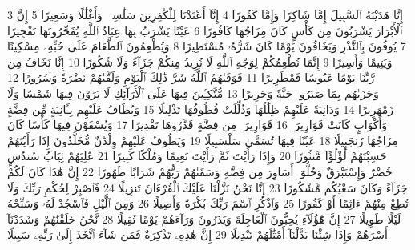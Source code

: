 {\tiny\colorbox{cl_aya}{3}} إِنَّا هَدَيْنَٰهُ ٱلسَّبِيلَ إِمَّا شَاكِرًا وَإِمَّا كَفُورًا
{\tiny\colorbox{cl_aya}{4}} إِنَّآ أَعْتَدْنَا لِلْكَٰفِرِينَ سَلَٰسِلَا۟ وَأَغْلَٰلًا وَسَعِيرًا
{\tiny\colorbox{cl_aya}{5}} إِنَّ ٱلْأَبْرَارَ يَشْرَبُونَ مِن كَأْسٍ كَانَ مِزَاجُهَا كَافُورًا
{\tiny\colorbox{cl_aya}{6}} عَيْنًا يَشْرَبُ بِهَا عِبَادُ ٱللَّهِ يُفَجِّرُونَهَا تَفْجِيرًا
{\tiny\colorbox{cl_aya}{7}} يُوفُونَ بِٱلنَّذْرِ وَيَخَافُونَ يَوْمًا كَانَ شَرُّهُۥ مُسْتَطِيرًا
{\tiny\colorbox{cl_aya}{8}} وَيُطْعِمُونَ ٱلطَّعَامَ عَلَىٰ حُبِّهِۦ مِسْكِينًا وَيَتِيمًا وَأَسِيرًا
{\tiny\colorbox{cl_aya}{9}} إِنَّمَا نُطْعِمُكُمْ لِوَجْهِ ٱللَّهِ لَا نُرِيدُ مِنكُمْ جَزَآءً وَلَا شُكُورًا
{\tiny\colorbox{cl_aya}{10}} إِنَّا نَخَافُ مِن رَّبِّنَا يَوْمًا عَبُوسًا قَمْطَرِيرًا
{\tiny\colorbox{cl_aya}{11}} فَوَقَىٰهُمُ ٱللَّهُ شَرَّ ذَٰلِكَ ٱلْيَوْمِ وَلَقَّىٰهُمْ نَضْرَةً وَسُرُورًا
{\tiny\colorbox{cl_aya}{12}} وَجَزَىٰهُم بِمَا صَبَرُوا۟ جَنَّةً وَحَرِيرًا
{\tiny\colorbox{cl_aya}{13}} مُّتَّكِـِٔينَ فِيهَا عَلَى ٱلْأَرَآئِكِ لَا يَرَوْنَ فِيهَا شَمْسًا وَلَا زَمْهَرِيرًا
{\tiny\colorbox{cl_aya}{14}} وَدَانِيَةً عَلَيْهِمْ ظِلَٰلُهَا وَذُلِّلَتْ قُطُوفُهَا تَذْلِيلًا
{\tiny\colorbox{cl_aya}{15}} وَيُطَافُ عَلَيْهِم بِـَٔانِيَةٍ مِّن فِضَّةٍ وَأَكْوَابٍ كَانَتْ قَوَارِيرَا۠
{\tiny\colorbox{cl_aya}{16}} قَوَارِيرَا۟ مِن فِضَّةٍ قَدَّرُوهَا تَقْدِيرًا
{\tiny\colorbox{cl_aya}{17}} وَيُسْقَوْنَ فِيهَا كَأْسًا كَانَ مِزَاجُهَا زَنجَبِيلًا
{\tiny\colorbox{cl_aya}{18}} عَيْنًا فِيهَا تُسَمَّىٰ سَلْسَبِيلًا
{\tiny\colorbox{cl_aya}{19}} وَيَطُوفُ عَلَيْهِمْ وِلْدَٰنٌ مُّخَلَّدُونَ إِذَا رَأَيْتَهُمْ حَسِبْتَهُمْ لُؤْلُؤًا مَّنثُورًا
{\tiny\colorbox{cl_aya}{20}} وَإِذَا رَأَيْتَ ثَمَّ رَأَيْتَ نَعِيمًا وَمُلْكًا كَبِيرًا
{\tiny\colorbox{cl_aya}{21}} عَٰلِيَهُمْ ثِيَابُ سُندُسٍ خُضْرٌ وَإِسْتَبْرَقٌ وَحُلُّوٓا۟ أَسَاوِرَ مِن فِضَّةٍ وَسَقَىٰهُمْ رَبُّهُمْ شَرَابًا طَهُورًا
{\tiny\colorbox{cl_aya}{22}} إِنَّ هَٰذَا كَانَ لَكُمْ جَزَآءً وَكَانَ سَعْيُكُم مَّشْكُورًا
{\tiny\colorbox{cl_aya}{23}} إِنَّا نَحْنُ نَزَّلْنَا عَلَيْكَ ٱلْقُرْءَانَ تَنزِيلًا
{\tiny\colorbox{cl_aya}{24}} فَٱصْبِرْ لِحُكْمِ رَبِّكَ وَلَا تُطِعْ مِنْهُمْ ءَاثِمًا أَوْ كَفُورًا
{\tiny\colorbox{cl_aya}{25}} وَٱذْكُرِ ٱسْمَ رَبِّكَ بُكْرَةً وَأَصِيلًا
{\tiny\colorbox{cl_aya}{26}} وَمِنَ ٱلَّيْلِ فَٱسْجُدْ لَهُۥ وَسَبِّحْهُ لَيْلًا طَوِيلًا
{\tiny\colorbox{cl_aya}{27}} إِنَّ هَٰٓؤُلَآءِ يُحِبُّونَ ٱلْعَاجِلَةَ وَيَذَرُونَ وَرَآءَهُمْ يَوْمًا ثَقِيلًا
{\tiny\colorbox{cl_aya}{28}} نَّحْنُ خَلَقْنَٰهُمْ وَشَدَدْنَآ أَسْرَهُمْ وَإِذَا شِئْنَا بَدَّلْنَآ أَمْثَٰلَهُمْ تَبْدِيلًا
{\tiny\colorbox{cl_aya}{29}} إِنَّ هَٰذِهِۦ تَذْكِرَةٌ فَمَن شَآءَ ٱتَّخَذَ إِلَىٰ رَبِّهِۦ سَبِيلًا
